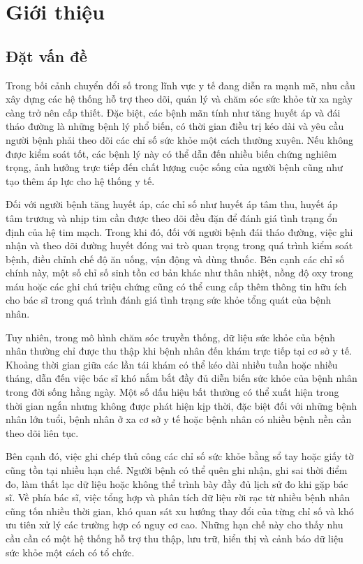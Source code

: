 \chapter{Giới thiệu}
\label{Chapter1}

\section{Đặt vấn đề}
Trong bối cảnh chuyển đổi số trong lĩnh vực y tế đang diễn ra mạnh mẽ, nhu cầu xây dựng các hệ thống hỗ trợ theo dõi, quản lý và chăm sóc sức khỏe từ xa ngày càng trở nên cấp thiết. Đặc biệt, các bệnh mãn tính như tăng huyết áp và đái tháo đường là những bệnh lý phổ biến, có thời gian điều trị kéo dài và yêu cầu người bệnh phải theo dõi các chỉ số sức khỏe một cách thường xuyên. Nếu không được kiểm soát tốt, các bệnh lý này có thể dẫn đến nhiều biến chứng nghiêm trọng, ảnh hưởng trực tiếp đến chất lượng cuộc sống của người bệnh cũng như tạo thêm áp lực cho hệ thống y tế.

Đối với người bệnh tăng huyết áp, các chỉ số như huyết áp tâm thu, huyết áp tâm trương và nhịp tim cần được theo dõi đều đặn để đánh giá tình trạng ổn định của hệ tim mạch. Trong khi đó, đối với người bệnh đái tháo đường, việc ghi nhận và theo dõi đường huyết đóng vai trò quan trọng trong quá trình kiểm soát bệnh, điều chỉnh chế độ ăn uống, vận động và dùng thuốc. Bên cạnh các chỉ số chính này, một số chỉ số sinh tồn cơ bản khác như thân nhiệt, nồng độ oxy trong máu hoặc các ghi chú triệu chứng cũng có thể cung cấp thêm thông tin hữu ích cho bác sĩ trong quá trình đánh giá tình trạng sức khỏe tổng quát của bệnh nhân.

Tuy nhiên, trong mô hình chăm sóc truyền thống, dữ liệu sức khỏe của bệnh nhân thường chỉ được thu thập khi bệnh nhân đến khám trực tiếp tại cơ sở y tế. Khoảng thời gian giữa các lần tái khám có thể kéo dài nhiều tuần hoặc nhiều tháng, dẫn đến việc bác sĩ khó nắm bắt đầy đủ diễn biến sức khỏe của bệnh nhân trong đời sống hằng ngày. Một số dấu hiệu bất thường có thể xuất hiện trong thời gian ngắn nhưng không được phát hiện kịp thời, đặc biệt đối với những bệnh nhân lớn tuổi, bệnh nhân ở xa cơ sở y tế hoặc bệnh nhân có nhiều bệnh nền cần theo dõi liên tục.

Bên cạnh đó, việc ghi chép thủ công các chỉ số sức khỏe bằng sổ tay hoặc giấy tờ cũng tồn tại nhiều hạn chế. Người bệnh có thể quên ghi nhận, ghi sai thời điểm đo, làm thất lạc dữ liệu hoặc không thể trình bày đầy đủ lịch sử đo khi gặp bác sĩ. Về phía bác sĩ, việc tổng hợp và phân tích dữ liệu rời rạc từ nhiều bệnh nhân cũng tốn nhiều thời gian, khó quan sát xu hướng thay đổi của từng chỉ số và khó ưu tiên xử lý các trường hợp có nguy cơ cao. Những hạn chế này cho thấy nhu cầu cần có một hệ thống hỗ trợ thu thập, lưu trữ, hiển thị và cảnh báo dữ liệu sức khỏe một cách có tổ chức.

